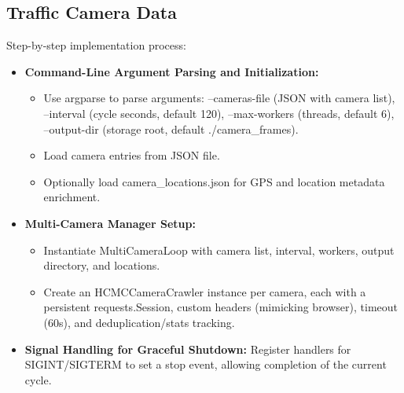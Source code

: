 \subsection{Traffic Camera Data}
Step-by-step implementation process:
\begin{itemize}
\item \textbf{Command-Line Argument Parsing and Initialization:}
\begin{itemize}
\item  Use argparse to parse arguments: --cameras-file (JSON with camera list), --interval (cycle seconds, default 120), --max-workers (threads, default 6), --output-dir (storage root, default ./camera\_frames). 
\item Load camera entries from JSON file. 
\item Optionally load camera\_locations.json for GPS and location metadata enrichment.
\end{itemize}

\item \textbf{Multi-Camera Manager Setup:}
\begin{itemize}
    \item Instantiate MultiCameraLoop with camera list, interval, workers, output directory, and locations.
    \item Create an HCMCCameraCrawler instance per camera, each with a persistent requests.Session, custom headers (mimicking browser), timeout (60s), and deduplication/stats tracking.
\end{itemize}

\item \textbf{Signal Handling for Graceful Shutdown:}
Register handlers for SIGINT/SIGTERM to set a stop event, allowing completion of the current cycle.


\end{itemize}
